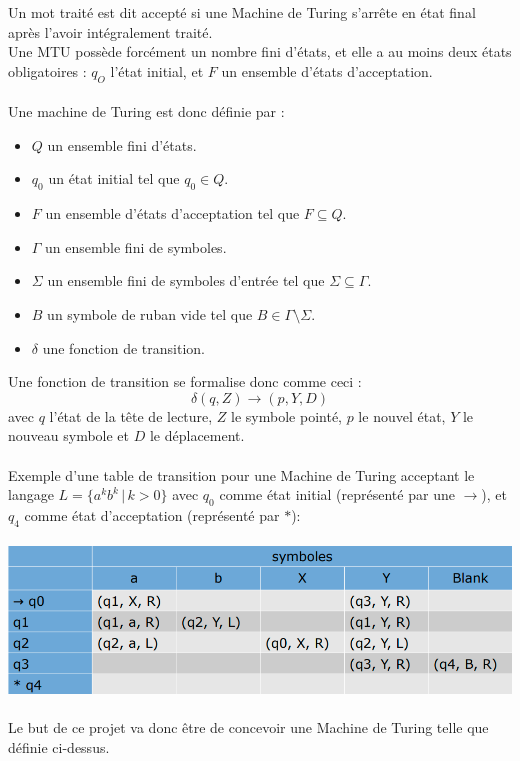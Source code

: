 \documentclass[12pt]{report}
\begin{document}
	 Un mot traité est dit accepté si une Machine de Turing s'arrête en état final après l'avoir intégralement traité.\\
	 Une MTU possède forcément un nombre fini d'états, et elle a au moins deux états obligatoires : $q_O$ l'état initial, et $F$ un ensemble d'états d'acceptation.\\
	 \\
	 Une machine de Turing est donc définie par :\\
	 \begin{itemize}[label=$-$]
	 	\item $Q$ un ensemble fini d'états.\\
	 	\item $q_0$ un état initial tel que $q_0 \in Q$.\\
	 	\item $F$ un ensemble d'états d'acceptation tel que $F \subseteq Q$.\\
	 	\item $\Gamma$ un ensemble fini de symboles.\\
	 	\item $\Sigma$ un ensemble fini de symboles d'entrée tel que $\Sigma \subseteq \Gamma$.\\
	 	\item $B$ un symbole de ruban vide tel que $B \in \Gamma \setminus \Sigma$.
	 	\item $\delta$ une fonction de transition.\\
	\end{itemize}
	 Une fonction de transition se formalise donc comme ceci :\\
	 \[ \delta (q, Z) \to (p, Y, D) \]
	 avec $q$ l'état de la tête de lecture, $Z$ le symbole pointé, $p$ le nouvel état, $Y$ le nouveau symbole et $D$ le déplacement.\\
	 \\
	 Exemple d'une table de transition pour une Machine de Turing acceptant le langage $L = \lbrace a^kb^k \, \vert \, k > 0 \rbrace$ avec $q_0$ comme état initial (représenté par une $\to$), et $q_4$ comme état d'acceptation (représenté par $\ast$):\\
	 \\
	 \includegraphics[width=\textwidth]{img/fig1}
	 \\
	 \\
	 Le but de ce projet va donc être de concevoir une Machine de Turing telle que définie ci-dessus.
\end{document}
